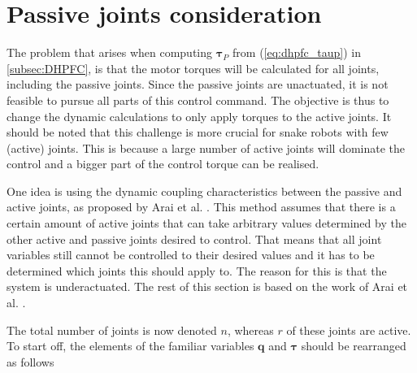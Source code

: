 \section{Passive joints consideration}\label{subsec:passive-joints}

The problem that arises when computing $\boldsymbol{\tau}_P$ from (\ref{eq:dhpfc_taup}) in \ref{subsec:DHPFC}, is that the motor torques will be calculated for all joints, including the passive joints. Since the passive joints are unactuated, it is not feasible to pursue all parts of this control command. The objective is thus to change the dynamic calculations to only apply torques to the active joints. It should be noted that this challenge is more crucial for snake robots with few (active) joints. This is because a large number of active joints will dominate the control and a bigger part of the control torque can be realised.

One idea is using the dynamic coupling characteristics between the passive and active joints, as proposed by Arai et al. \cite{arai1991position}. This method assumes that there is a certain amount of active joints that can take arbitrary values determined by the other active and passive joints desired to control. That means that all joint variables still cannot be controlled to their desired values and it has to be determined which joints this should apply to. The reason for this is that the system is underactuated. The rest of this section is based on the work of Arai et al. \cite{arai1991position}.

The total number of joints is now denoted $n$, whereas $r$ of these joints are active. To start off, the elements of the familiar variables $\mathbf{q}$ and $\boldsymbol{\tau}$ should be rearranged as follows


